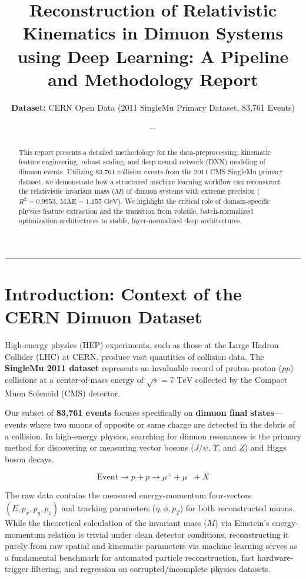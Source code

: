 \documentclass[11pt,a4paper]{article}
\title{\textbf{Reconstruction of Relativistic Kinematics in Dimuon Systems using Deep Learning: A Pipeline and Methodology Report}}
\author{\textbf{Dataset:} CERN Open Data (2011 SingleMu Primary Dataset, 83,761 Events)}
\date{\number\year-\number\month-\number\day}
\begin{document}
\pagestyle{empty}

\maketitle
\thispagestyle{empty}

\begin{abstract}
This report presents a detailed methodology for the data-preprocessing, kinematic feature engineering, robust scaling, and deep neural network (DNN) modeling of dimuon events. Utilizing 83,761 collision events from the 2011 CMS SingleMu primary dataset, we demonstrate how a structured machine learning workflow can reconstruct the relativistic invariant mass ($M$) of dimuon systems with extreme precision ($R^2 = 0.9953$, $\text{MAE} = 1.155 \text{ GeV}$). We highlight the critical role of domain-specific physics feature extraction and the transition from volatile, batch-normalized optimization architectures to stable, layer-normalized deep architectures.
\end{abstract}

\hrule
\vspace{0.5cm}

\section{Introduction: Context of the CERN Dimuon Dataset}

High-energy physics (HEP) experiments, such as those at the Large Hadron Collider (LHC) at CERN, produce vast quantities of collision data. The \textbf{SingleMu 2011 dataset} represents an invaluable record of proton-proton ($pp$) collisions at a center-of-mass energy of $\sqrt{s} = 7 \text{ TeV}$ collected by the Compact Muon Solenoid (CMS) detector.

Our subset of \textbf{83,761 events} focuses specifically on \textbf{dimuon final states}—events where two muons of opposite or same charge are detected in the debris of a collision. In high-energy physics, searching for dimuon resonances is the primary method for discovering or measuring vector bosons ($J/\psi$, $\Upsilon$, and $Z$) and Higgs boson decays.

\begin{equation}
\text{Event} \longrightarrow p + p \longrightarrow \mu^+ + \mu^- + X
\end{equation}

The raw data contains the measured energy-momentum four-vectors $(E, p_x, p_y, p_z)$ and tracking parameters ($\eta, \phi, p_T$) for both reconstructed muons. While the theoretical calculation of the invariant mass ($M$) via Einstein's energy-momentum relation is trivial under clean detector conditions, reconstructing it purely from raw spatial and kinematic parameters via machine learning serves as a fundamental benchmark for automated particle reconstruction, fast hardware-trigger filtering, and regression on corrupted/incomplete physics datasets.
\end{document}
